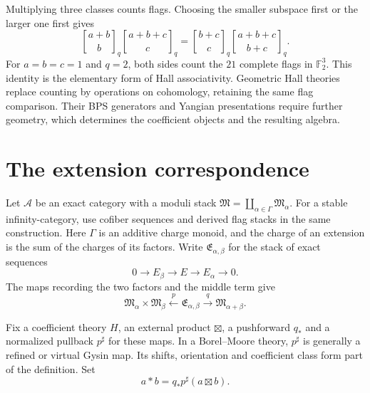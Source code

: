 Multiplying three classes counts flags.
Choosing the smaller subspace first or the larger one first gives
\[
 {a+b\brack b}_q{a+b+c\brack c}_q
 = {b+c\brack c}_q{a+b+c\brack b+c}_q.
\]
For $a=b=c=1$ and $q=2$, both sides count the $21$ complete flags in $\mathbb F_2^3$.
This identity is the elementary form of Hall associativity.
Geometric Hall theories replace counting by operations on cohomology, retaining the same flag comparison.
Their BPS generators and Yangian presentations require further geometry, which determines the coefficient objects and the resulting algebra.

\section{The extension correspondence}
Let $\mathcal A$ be an exact category with a moduli stack
$\mathfrak M=\coprod_{\alpha\in\Gamma}\mathfrak M_\alpha$.
For a stable infinity-category, use cofiber sequences and derived flag stacks in the same construction.
Here $\Gamma$ is an additive charge monoid, and the charge of an extension is the sum of the charges of its factors.
Write $\mathfrak E_{\alpha,\beta}$ for the stack of exact sequences
\[
 0\longrightarrow E_\beta\longrightarrow E
   \longrightarrow E_\alpha\longrightarrow0.
\]
The maps recording the two factors and the middle term give
\[
 \mathfrak M_\alpha\times\mathfrak M_\beta
 \xleftarrow{\ p\ }\mathfrak E_{\alpha,\beta}
 \xrightarrow{\ q\ }\mathfrak M_{\alpha+\beta}.
\]

Fix a coefficient theory $H$, an external product $\boxtimes$, a pushforward $q_*$ and a normalized pullback $p^\sharp$ for these maps.
In a Borel--Moore theory, $p^\sharp$ is generally a refined or virtual Gysin map.
Its shifts, orientation and coefficient class form part of the definition.
Set
\begin{equation}\label{cbc:hall:product}
 a*b=q_*p^\sharp(a\boxtimes b).
\end{equation}

